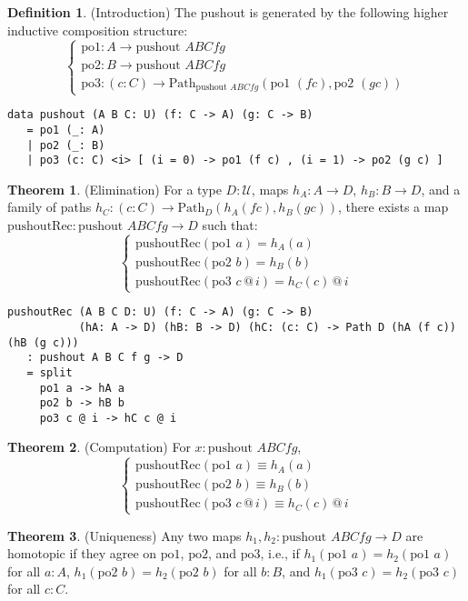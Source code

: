 \documentclass{article}
\theoremstyle{definition}
\newtheorem{theorem}{Theorem}
\newtheorem{definition}{Definition}
\begin{document}
\begin{definition} (Introduction)
The pushout is generated by the following higher inductive composition structure:
\[
\begin{cases}
\text{po1} : A \to \text{pushout } A B C f g \\
\text{po2} : B \to \text{pushout } A B C f g \\
\text{po3} : (c : C) \to \text{Path}_{\text{pushout } A B C f g} (\text{po1 } (f c), \text{po2 } (g c))
\end{cases}
\]
\begin{lstlisting}
data pushout (A B C: U) (f: C -> A) (g: C -> B)
   = po1 (_: A)
   | po2 (_: B)
   | po3 (c: C) <i> [ (i = 0) -> po1 (f c) , (i = 1) -> po2 (g c) ]
\end{lstlisting}
\end{definition}

\begin{theorem} (Elimination)
For a type $D : \mathcal{U}$, maps $h_A : A \to D$, $h_B : B \to D$, and a family of paths $h_C : (c : C) \to \text{Path}_D (h_A (f c), h_B (g c))$, there exists a map $\text{pushoutRec} : \text{pushout } A B C f g \to D$ such that:
\[
\begin{cases}
\text{pushoutRec}(\text{po1 } a) = h_A(a) \\
\text{pushoutRec}(\text{po2 } b) = h_B(b) \\
\text{pushoutRec}(\text{po3 } c \, @ \, i) = h_C(c) \, @ \, i
\end{cases}
\]
\begin{lstlisting}
pushoutRec (A B C D: U) (f: C -> A) (g: C -> B) 
           (hA: A -> D) (hB: B -> D) (hC: (c: C) -> Path D (hA (f c)) (hB (g c)))
   : pushout A B C f g -> D
   = split
     po1 a -> hA a
     po2 b -> hB b
     po3 c @ i -> hC c @ i
\end{lstlisting}
\end{theorem}

\begin{theorem} (Computation)
For $x : \text{pushout } A B C f g$,
\[
\begin{cases}
\text{pushoutRec}(\text{po1 } a) \equiv h_A(a) \\
\text{pushoutRec}(\text{po2 } b) \equiv h_B(b) \\
\text{pushoutRec}(\text{po3 } c \, @ \, i) \equiv h_C(c) \, @ \, i
\end{cases}
\]
\end{theorem}

\begin{theorem} (Uniqueness)
Any two maps $h_1, h_2 : \text{pushout } A B C f g \to D$ are homotopic if they agree on $\text{po1}$, $\text{po2}$, and $\text{po3}$, i.e., if $h_1(\text{po1 } a) = h_2(\text{po1 } a)$ for all $a : A$, $h_1(\text{po2 } b) = h_2(\text{po2 } b)$ for all $b : B$, and $h_1(\text{po3 } c) = h_2(\text{po3 } c)$ for all $c : C$.
\end{theorem}
\end{document}
